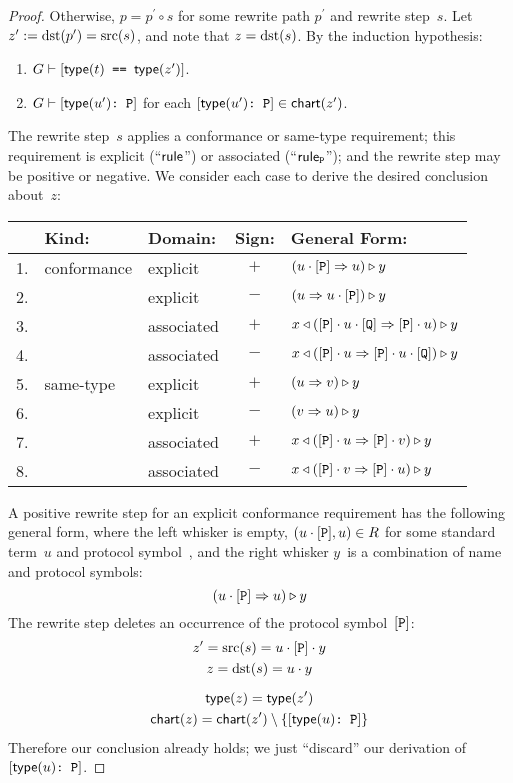 \documentclass[../generics]{subfiles}
\begin{document}
\begin{proof}
\InductiveStep Otherwise, $p=p^\prime \circ s$ for some rewrite path $p^\prime$ and rewrite step~$s$. Let $z^\prime := \operatorname{dst}(p^\prime) = \operatorname{src}(s)$, and note that $z=\operatorname{dst}(s)$. By the induction hypothesis:
\begin{enumerate}
\item $G \vdash [\texttt{$\mathsf{type}(t)$ == $\mathsf{type}(z^\prime)$}]$.
\item $G \vdash [\texttt{$\mathsf{type}(u^\prime)$:~P}]$ for each $[\texttt{$\mathsf{type}(u^\prime)$:~P}]\in\mathsf{chart}(z^\prime)$.
\end{enumerate}
The rewrite step~$s$ applies a conformance or same-type requirement; this requirement is explicit (``$\mathsf{rule}$'') or associated (``$\mathsf{rule}_{\texttt{P}}$''); and the rewrite step may be positive or negative. We consider each case to derive the desired conclusion about~$z$:
\begin{center}
\begin{tabular}{lllcl}
\toprule
&\textbf{Kind:}&\textbf{Domain:}&\textbf{Sign:}&\textbf{General Form:}\\
\midrule
1.&conformance&explicit&$+$&$(u\cdot[\texttt{P}]\Rightarrow u)\triangleright y$\\
2.&&explicit&$-$&$(u\Rightarrow u\cdot[\texttt{P}])\triangleright y$\\
3.&&associated&$+$&$x\triangleleft([\texttt{P}]\cdot u\cdot[\texttt{Q}]\Rightarrow[\texttt{P}]\cdot u)\triangleright y$\\
4.&&associated&$-$&$x\triangleleft([\texttt{P}]\cdot u\Rightarrow[\texttt{P}]\cdot u\cdot[\texttt{Q}])\triangleright y$\\
\midrule
5.&same-type&explicit&$+$&$(u\Rightarrow v)\triangleright y$\\
6.&&explicit&$-$&$(v\Rightarrow u)\triangleright y$\\
7.&&associated&$+$&$x\triangleleft([\texttt{P}]\cdot u\Rightarrow[\texttt{P}]\cdot v)\triangleright y$\\
8.&&associated&$-$&$x\triangleleft([\texttt{P}]\cdot v\Rightarrow[\texttt{P}]\cdot u)\triangleright y$\\
\bottomrule
\end{tabular}
\end{center}

 A positive rewrite step for an explicit conformance requirement has the following general form, where the left whisker is empty, $(u\cdot[\texttt{P}],u)\in R$ for some standard term~$u$ and protocol symbol~\pP, and the right whisker $y$~is a combination of name and protocol symbols:
\[(u\cdot[\texttt{P}]\Rightarrow u)\triangleright y\]
The rewrite step deletes an occurrence of the protocol symbol~$[\texttt{P}]$:
\begin{gather*}
z^\prime=\operatorname{src}(s)=u\cdot[\texttt{P}]\cdot y\\
z=\operatorname{dst}(s)=u\cdot y\\[\medskipamount]
\mathsf{type}(z)=\mathsf{type}(z^\prime)\\
\mathsf{chart}(z)=\mathsf{chart}(z^\prime) \setminus \{[\texttt{$\mathsf{type}(u)$:~P}]\}
\end{gather*}
Therefore our conclusion already holds; we just ``discard'' our derivation of $[\texttt{$\mathsf{type}(u)$:~P}]$.


\end{proof}
\end{document}
